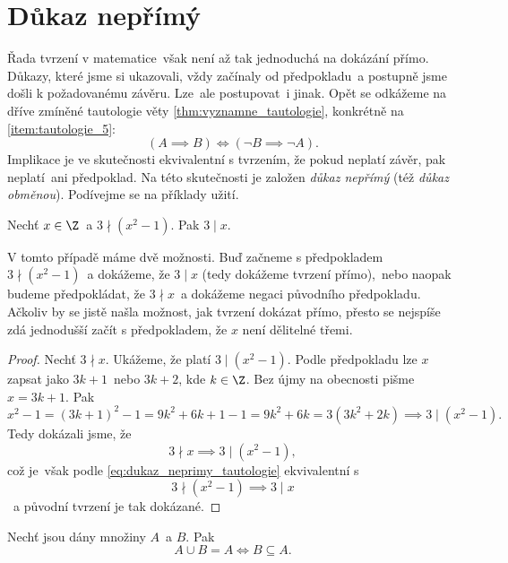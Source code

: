 \section{Důkaz nepřímý}\label{sec:dukaz_neprimy}
Řada tvrzení v matematice~však není až tak jednoduchá na dokázání přímo. Důkazy, které jsme si ukazovali, vždy začínaly od předpokladu~a postupně jsme došli k požadovanému závěru. Lze~ale postupovat~i jinak. Opět se odkážeme na dříve zmíněné tautologie věty \ref{thm:vyznamne_tautologie}, konkrétně na \ref{item:tautologie_5}:
\begin{equation}\label{eq:dukaz_neprimy_tautologie}
    (A \implies B) \iff (\neg B \implies \neg A).
\end{equation}
Implikace je ve skutečnosti ekvivalentní s tvrzením, že pokud neplatí závěr, pak neplatí~ani předpoklad. Na této skutečnosti je založen \emph{důkaz nepřímý} (též \emph{důkaz obměnou}). Podívejme se na příklady užití.
\begin{proposition}
    Nechť $x\in\Z$~a $3 \nmid (x^2-1)$. Pak $3 \mid x$.
\end{proposition}
V tomto případě máme dvě možnosti. Buď začneme s předpokladem $3 \nmid (x^2-1)$~a dokážeme, že $3 \mid x$ (tedy dokážeme tvrzení přímo),~nebo naopak budeme předpokládat, že $3 \nmid x$~a dokážeme negaci původního předpokladu. Ačkoliv by se jistě našla možnost, jak tvrzení dokázat přímo, přesto se nejspíše zdá jednodušší začít s předpokladem, že $x$ není dělitelné třemi.
\begin{proof}
    Nechť $3 \nmid x$. Ukážeme, že platí $3 \mid (x^2-1)$. Podle předpokladu lze $x$ zapsat jako $3k+1$~nebo $3k+2$, kde $k\in\Z$. Bez újmy na obecnosti pišme $x=3k+1$. Pak
    \begin{equation*}
        x^2-1=(3k+1)^2-1=9k^2+6k+1-1=9k^2+6k=3(3k^2+2k)\implies 3 \mid (x^2-1).
    \end{equation*}
    Tedy dokázali jsme, že
    \begin{equation*}
        3 \nmid x \implies 3 \mid (x^2-1),
    \end{equation*}
    což je~však podle \ref{eq:dukaz_neprimy_tautologie} ekvivalentní s
    \begin{equation*}
        3 \nmid (x^2-1) \implies 3 \mid x
    \end{equation*}
   ~a původní tvrzení je tak dokázané.
\end{proof}
\begin{proposition}
    Nechť jsou dány množiny $A$~a $B$. Pak
    \begin{equation*}
        A \cup B=A \iff B \subseteq A.
    \end{equation*}
\end{proposition}
